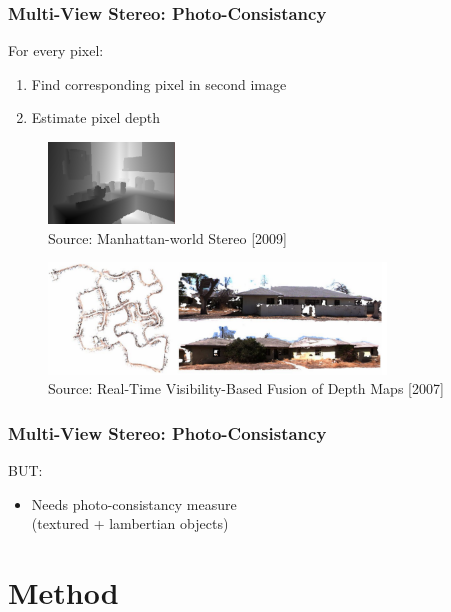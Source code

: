 \documentclass{beamer}
\begin{document}
\begin{frame}
  \frametitle{Multi-View Stereo: Photo-Consistancy}
  For every pixel:
  \begin{enumerate}
    \item Find corresponding pixel in second image
    \item Estimate pixel depth
  \end{enumerate}

  \begin{figure}[htb!]
   \centering
   \includegraphics[width=0.3\textwidth]{img/depthmap_single}
   \caption*{\tiny Source: Manhattan-world Stereo [2009]}
  \end{figure}
  \begin{figure}[htb!]
   \centering
   \includegraphics[width=0.8\textwidth]{img/depthmap_merged}
   \caption*{\tiny Source: Real-Time Visibility-Based Fusion of Depth Maps [2007]}
  \end{figure}
\end{frame}

\begin{frame}
  \frametitle{Multi-View Stereo: Photo-Consistancy}
  BUT:
  \begin{itemize}
    \item Needs photo-consistancy measure \\
          (textured + lambertian objects)
  \end{itemize}
\end{frame}




\section{Method}
\end{document}
